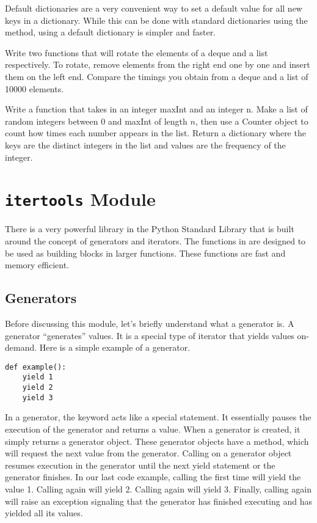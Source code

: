 Default dictionaries are a very convenient way to set a default value for all new keys in a dictionary.
While this can be done with standard dictionaries using the  method, using a default dictionary is simpler and faster.

\begin{problem}
Write two functions that will rotate the elements of a deque and a list respectively.
To rotate, remove elements from the right end one by one and insert them on the left end.
Compare the timings you obtain from a deque and a list of 10000 elements.
\end{problem}

\begin{problem}
Write a function that takes in an integer maxInt and an integer n.
Make a list of random integers between 0 and maxInt of length $n$, then use a Counter object to count how times each number appears in the list.
Return a dictionary where the keys are the distinct integers in the list and values are the frequency of the integer.
\end{problem}

\section*{\texttt{itertools} Module}
There is a very powerful library in the Python Standard Library that is built around the concept
of generators and iterators.  The functions in  are designed to be used as
building blocks in larger functions.  These functions are fast and memory efficient.

\subsection*{Generators}
Before discussing this module, let's briefly understand what a generator is.
A generator ``generates'' values.  It is a special type of iterator that yields values on-demand.  Here is a simple example of a generator.
\begin{lstlisting}
def example():
    yield 1
    yield 2
    yield 3
\end{lstlisting}
In a generator, the  keyword acts like a special  statement.  
It essentially pauses the execution of the generator and returns a value.
When a generator is created, it simply returns a generator object.
These generator objects have a  method, which will request the next value from the generator.
Calling  on a generator object resumes execution in the generator until the next yield statement or the generator finishes.
In our last code example, calling  the first time will yield the value 1.  Calling  again will yield 2.  Calling  again will yield 3.  Finally, calling  again will raise an exception signaling that the generator has finished executing and has yielded all its values.

